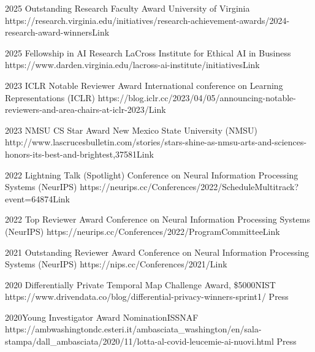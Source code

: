 \begin{awards}
	\awardentry
	{2025}
	{Outstanding Research Faculty Award}
	{University of Virginia}%
	{https://research.virginia.edu/initiatives/research-achievement-awards/2024-research-award-winners}{Link}

	\awardentry
	{2025}
	{Fellowship in AI Research}
	{LaCross Institute for Ethical AI in Business}%
	{https://www.darden.virginia.edu/lacross-ai-institute/initiatives}{Link}

	\awardentry
	{2023}
	{ICLR Notable Reviewer Award}%
	{International conference on Learning Representations (ICLR)} 
	{https://blog.iclr.cc/2023/04/05/announcing-notable-reviewers-and-area-chairs-at-iclr-2023/}{Link}

	\awardentry
	{2023}
	{NMSU CS Star Award}%
	{New Mexico State University (NMSU)} 
	{http://www.lascrucesbulletin.com/stories/stars-shine-as-nmsu-arts-and-sciences-honors-its-best-and-brightest,37581}{Link}

	\awardentry
	{2022}
	{Lightning Talk (Spotlight)}%
	{Conference on Neural Information Processing Systems (NeurIPS)} 
	{https://neurips.cc/Conferences/2022/ScheduleMultitrack?event=64874}{Link}

	\awardentry
	{2022}
	{Top Reviewer Award}%
	{Conference on Neural Information Processing Systems (NeurIPS)} 
	{https://neurips.cc/Conferences/2022/ProgramCommittee}{Link}

	\awardentry
	{2021}
	{Outstanding Reviewer Award}%
	{Conference on Neural Information Processing Systems (NeurIPS)} 
	{https://nips.cc/Conferences/2021/}{Link}

	\awardentry
	{2020}
	{Differentially Private Temporal Map Challenge Award, \$5000}{NIST}
	{https://www.drivendata.co/blog/differential-privacy-winners-sprint1/}
	{Press}

\awardentry
  	{2020}{Young Investigator Award Nomination}{ISSNAF} 
	{https://ambwashingtondc.esteri.it/ambasciata\_washington/en/sala-stampa/dall\_ambasciata/2020/11/lotta-al-covid-leucemie-ai-nuovi.html}
	{Press}


\end{awards}
